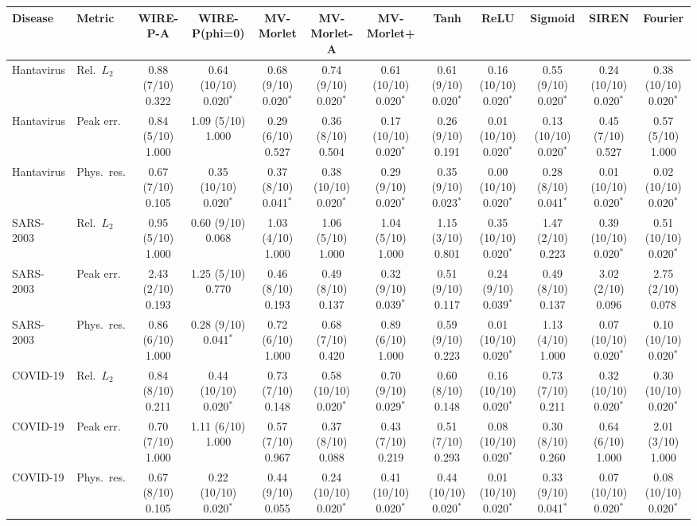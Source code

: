 \begin{tabular}{llcccccccccc}
\toprule
Disease & Metric & WIRE-P-A & WIRE-P(phi=0) & MV-Morlet & MV-Morlet-A & MV-Morlet+ & Tanh & ReLU & Sigmoid & SIREN & Fourier \\
\midrule
Hantavirus & Rel.\ $L_2$ & 0.88 (7/10) 0.322 & 0.64 (10/10) 0.020$^{*}$ & 0.68 (9/10) 0.020$^{*}$ & 0.74 (9/10) 0.020$^{*}$ & 0.61 (10/10) 0.020$^{*}$ & 0.61 (9/10) 0.020$^{*}$ & 0.16 (10/10) 0.020$^{*}$ & 0.55 (9/10) 0.020$^{*}$ & 0.24 (10/10) 0.020$^{*}$ & 0.38 (10/10) 0.020$^{*}$ \\
Hantavirus & Peak err. & 0.84 (5/10) 1.000 & 1.09 (5/10) 1.000 & 0.29 (6/10) 0.527 & 0.36 (8/10) 0.504 & 0.17 (10/10) 0.020$^{*}$ & 0.26 (9/10) 0.191 & 0.01 (10/10) 0.020$^{*}$ & 0.13 (10/10) 0.020$^{*}$ & 0.45 (7/10) 0.527 & 0.57 (5/10) 1.000 \\
Hantavirus & Phys.\ res. & 0.67 (7/10) 0.105 & 0.35 (10/10) 0.020$^{*}$ & 0.37 (8/10) 0.041$^{*}$ & 0.38 (10/10) 0.020$^{*}$ & 0.29 (9/10) 0.020$^{*}$ & 0.35 (9/10) 0.023$^{*}$ & 0.00 (10/10) 0.020$^{*}$ & 0.28 (8/10) 0.041$^{*}$ & 0.01 (10/10) 0.020$^{*}$ & 0.02 (10/10) 0.020$^{*}$ \\
\midrule
SARS-2003 & Rel.\ $L_2$ & 0.95 (5/10) 1.000 & 0.60 (9/10) 0.068 & 1.03 (4/10) 1.000 & 1.06 (5/10) 1.000 & 1.04 (5/10) 1.000 & 1.15 (3/10) 0.801 & 0.35 (10/10) 0.020$^{*}$ & 1.47 (2/10) 0.223 & 0.39 (10/10) 0.020$^{*}$ & 0.51 (10/10) 0.020$^{*}$ \\
SARS-2003 & Peak err. & 2.43 (2/10) 0.193 & 1.25 (5/10) 0.770 & 0.46 (8/10) 0.193 & 0.49 (8/10) 0.137 & 0.32 (9/10) 0.039$^{*}$ & 0.51 (9/10) 0.117 & 0.24 (9/10) 0.039$^{*}$ & 0.49 (8/10) 0.137 & 3.02 (2/10) 0.096 & 2.75 (2/10) 0.078 \\
SARS-2003 & Phys.\ res. & 0.86 (6/10) 1.000 & 0.28 (9/10) 0.041$^{*}$ & 0.72 (6/10) 1.000 & 0.68 (7/10) 0.420 & 0.89 (6/10) 1.000 & 0.59 (9/10) 0.223 & 0.01 (10/10) 0.020$^{*}$ & 1.13 (4/10) 1.000 & 0.07 (10/10) 0.020$^{*}$ & 0.10 (10/10) 0.020$^{*}$ \\
\midrule
COVID-19 & Rel.\ $L_2$ & 0.84 (8/10) 0.211 & 0.44 (10/10) 0.020$^{*}$ & 0.73 (7/10) 0.148 & 0.58 (10/10) 0.020$^{*}$ & 0.70 (9/10) 0.029$^{*}$ & 0.60 (8/10) 0.148 & 0.16 (10/10) 0.020$^{*}$ & 0.73 (7/10) 0.211 & 0.32 (10/10) 0.020$^{*}$ & 0.30 (10/10) 0.020$^{*}$ \\
COVID-19 & Peak err. & 0.70 (7/10) 1.000 & 1.11 (6/10) 1.000 & 0.57 (7/10) 0.967 & 0.37 (8/10) 0.088 & 0.43 (7/10) 0.219 & 0.51 (7/10) 0.293 & 0.08 (10/10) 0.020$^{*}$ & 0.30 (8/10) 0.260 & 0.64 (6/10) 1.000 & 2.01 (3/10) 1.000 \\
COVID-19 & Phys.\ res. & 0.67 (8/10) 0.105 & 0.22 (10/10) 0.020$^{*}$ & 0.44 (9/10) 0.055 & 0.24 (10/10) 0.020$^{*}$ & 0.41 (10/10) 0.020$^{*}$ & 0.44 (10/10) 0.020$^{*}$ & 0.01 (10/10) 0.020$^{*}$ & 0.33 (9/10) 0.041$^{*}$ & 0.07 (10/10) 0.020$^{*}$ & 0.08 (10/10) 0.020$^{*}$ \\
\bottomrule
\end{tabular}